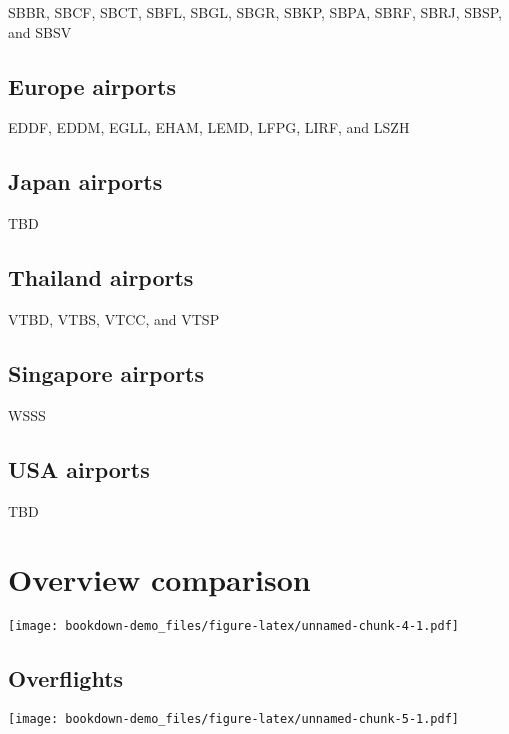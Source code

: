 \documentclass[
]{book}
\begin{document}
SBBR, SBCF, SBCT, SBFL, SBGL, SBGR, SBKP, SBPA, SBRF, SBRJ, SBSP, and SBSV

\hypertarget{europe-airports}{%
\section{Europe airports}\label{europe-airports}}

EDDF, EDDM, EGLL, EHAM, LEMD, LFPG, LIRF, and LSZH

\hypertarget{japan-airports}{%
\section{Japan airports}\label{japan-airports}}

TBD

\hypertarget{thailand-airports}{%
\section{Thailand airports}\label{thailand-airports}}

VTBD, VTBS, VTCC, and VTSP

\hypertarget{singapore-airports}{%
\section{Singapore airports}\label{singapore-airports}}

WSSS

\hypertarget{usa-airports}{%
\section{USA airports}\label{usa-airports}}

TBD

\hypertarget{overview-comparison}{%
\chapter{Overview comparison}\label{overview-comparison}}

\texttt{[image: bookdown-demo\_files/figure-latex/unnamed-chunk-4-1.pdf]}

\hypertarget{overflights}{%
\section{Overflights}\label{overflights}}

\texttt{[image: bookdown-demo\_files/figure-latex/unnamed-chunk-5-1.pdf]}
\end{document}
